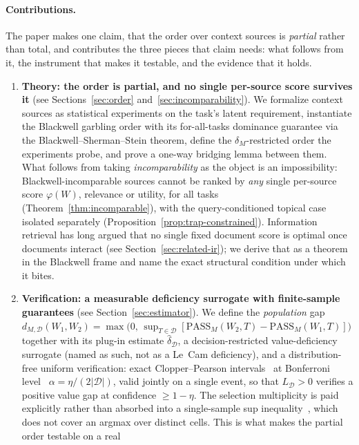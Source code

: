 \documentclass[11pt]{article}
\theoremstyle{plain}
\theoremstyle{definition}
\theoremstyle{remark}
\newcommand{\PASS}{\mathrm{PASS}}
\newcommand{\dhat}{\widehat{\delta}}
\newcommand{\Dcal}{\mathcal{D}}
\begin{document}
\paragraph{Contributions.} The paper makes one claim, that the order over context sources is
\emph{partial} rather than total, and contributes the three pieces that claim needs: what follows
from it, the instrument that makes it testable, and the evidence that it holds.
\begin{enumerate}
  \item[\textbf{(C1)}] \textbf{Theory: the order is partial, and no single per-source score survives it}
  (see Sections~\ref{sec:order} and~\ref{sec:incomparability}). We formalize context sources as statistical
  experiments on the task's latent requirement, instantiate the Blackwell garbling order with its
  for-all-tasks dominance guarantee via the Blackwell--Sherman--Stein theorem, define the
  $\delta_M$-restricted order the experiments probe, and prove a one-way bridging lemma between
  them. What follows from taking \emph{incomparability} as the object is an impossibility:
  Blackwell-incomparable sources cannot be ranked by \emph{any} single per-source score
  $\varphi(W)$, relevance or utility, for all tasks (Theorem~\ref{thm:incomparable}), with the
  query-conditioned topical case isolated separately (Proposition~\ref{prop:trap-constrained}).
  Information retrieval has long argued that no single fixed document score is optimal once
  documents interact (see Section~\ref{sec:related-ir}); we derive that as a theorem in the Blackwell frame
  and name the exact structural condition under which it bites.
  \item[\textbf{(C2)}] \textbf{Verification: a measurable deficiency surrogate with finite-sample
  guarantees} (see Section~\ref{sec:estimator}). We define the \emph{population} gap
  $d_{M,\Dcal}(W_1,W_2) = \max\!\big(0,\,
  \sup_{T\in\Dcal}[\PASS_M(W_2,T) - \PASS_M(W_1,T)]\big)$ together with its plug-in estimate
  $\dhat_{\Dcal}$, a
  decision-restricted value-deficiency surrogate (named as such, not as a Le~Cam deficiency), and a
  distribution-free uniform verification: exact Clopper--Pearson
  intervals~\citep{clopperpearson1934} at Bonferroni level~\citep{bonferroni1936}
  $\alpha = \eta/(2|\Dcal|)$, valid jointly on a single event, so that $L_{\Dcal}>0$ verifies a
  positive value gap at confidence $\geq 1-\eta$. The selection multiplicity is paid explicitly
  rather than absorbed into a single-sample sup inequality~\citep{dvoretzky1956}, which does not
  cover an argmax over distinct cells. This is what makes the partial order testable on a real

\end{enumerate}
\end{document}
